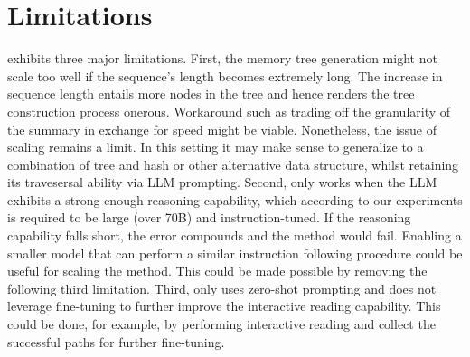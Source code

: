 \section{Limitations}\label{sec:limitation}
\vspace{-5pt}
\sysname{} exhibits three major limitations. First, the memory tree generation might not scale too well if the sequence's length becomes extremely long. The increase in sequence length entails more nodes in the tree and hence renders the tree construction process onerous. Workaround such as trading off the granularity of the summary in exchange for speed might be viable. Nonetheless, the issue of scaling remains a limit. In this setting it may make sense to generalize \sysname{} to a combination of tree and hash \cite{bawa2005lsh} or other alternative data structure, whilst retaining its travesersal ability via LLM prompting. 
Second, \sysname{} only works when the LLM exhibits a strong enough reasoning capability, which according to our experiments is required to be large (over 70B) and instruction-tuned. If the reasoning capability falls short, the error compounds and the method would fail. Enabling a smaller model that can perform a similar instruction following procedure could be useful for scaling the method. This could be made possible by removing the following third limitation.
Third, \sysname{} only uses zero-shot prompting and does not leverage fine-tuning to further improve the interactive reading capability. This could be done, for example, by performing interactive reading and collect the successful paths for further fine-tuning.

\newpage
\clearpage

